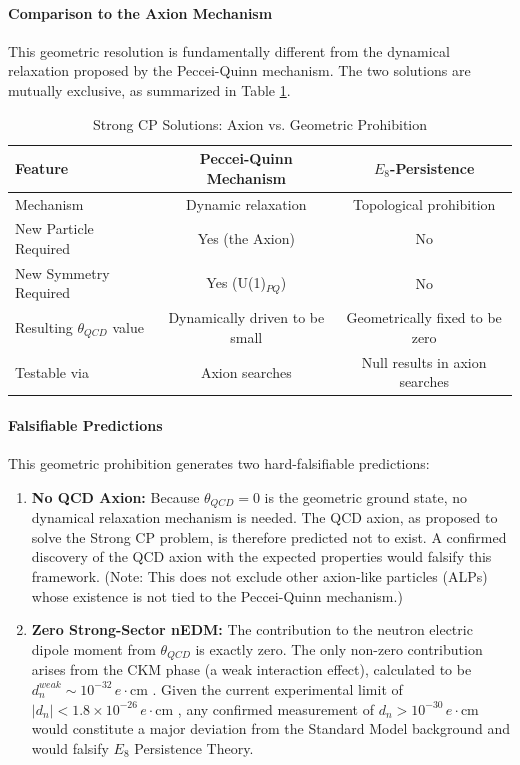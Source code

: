 \paragraph{Comparison to the Axion Mechanism}
This geometric resolution is fundamentally different from the dynamical relaxation proposed by the Peccei-Quinn mechanism. The two solutions are mutually exclusive, as summarized in Table \ref{tab:cp_solutions}.
\begin{table}[h]
\centering
\caption{Strong CP Solutions: Axion vs. Geometric Prohibition}
\begin{tabular}{lcc}
\toprule
\textbf{Feature} & \textbf{Peccei-Quinn Mechanism} & \textbf{$E_8$-Persistence} \\
\midrule
Mechanism & Dynamic relaxation & Topological prohibition \\
New Particle Required & Yes (the Axion) & No \\
New Symmetry Required & Yes (U(1)$_{PQ}$) & No \\
Resulting $\theta_{QCD}$ value & Dynamically driven to be small & Geometrically fixed to be zero \\
Testable via & Axion searches & Null results in axion searches \\
\bottomrule
\end{tabular}
\label{tab:cp_solutions}
\end{table}

\paragraph{Falsifiable Predictions}
This geometric prohibition generates two hard-falsifiable predictions:
\begin{enumerate}
    \item \textbf{No QCD Axion:} Because $\theta_{QCD}=0$ is the geometric ground state, no dynamical relaxation mechanism is needed. The QCD axion, as proposed to solve the Strong CP problem, is therefore predicted not to exist. A confirmed discovery of the QCD axion with the expected properties would falsify this framework. (Note: This does not exclude other axion-like particles (ALPs) whose existence is not tied to the Peccei-Quinn mechanism.)
    
    \item \textbf{Zero Strong-Sector nEDM:} The contribution to the neutron electric dipole moment from $\theta_{QCD}$ is exactly zero. The only non-zero contribution arises from the CKM phase (a weak interaction effect), calculated to be $d_n^{weak} \sim 10^{-32} \, e\cdot\text{cm}$ \cite{pospelov_electric_2005}. Given the current experimental limit of $|d_n| < 1.8 \times 10^{-26} \, e\cdot\text{cm}$ \cite{abel_measurement_2020}, any confirmed measurement of $d_n > 10^{-30} \, e\cdot\text{cm}$ would constitute a major deviation from the Standard Model background and would falsify {$E_8$} Persistence Theory.
\end{enumerate}